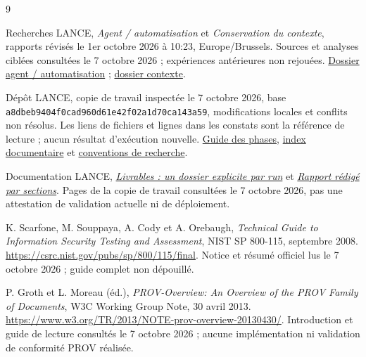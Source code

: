 \documentclass[11pt,a4paper]{article}
\newcommand{\code}[1]{\nolinkurl{#1}}
\begin{document}
\begin{thebibliography}{9}
 Recherches LANCE, \emph{Agent / automatisation} et
\emph{Conservation du contexte}, rapports révisés le 1er octobre 2026 à 10:23,
Europe/Brussels. Sources et analyses ciblées consultées le 7 octobre 2026 ;
expériences antérieures non rejouées.
\href{../2026-09-27-agent-vs-automation/README.md}{Dossier agent / automatisation} ;
\href{../2026-09-29-context-scalability/README.md}{dossier contexte}.

 Dépôt LANCE, copie de travail inspectée le 7 octobre 2026,
base \code{a8dbeb9404f0cad960d61e42f02a1d70ca143a59}, modifications locales et
conflits non résolus. Les liens de fichiers et lignes dans les constats sont
la référence de lecture ; aucun résultat d'exécution nouvelle.
\href{../../src/agent/phases/README.md}{Guide des phases},
\href{../../docs/README.md}{index documentaire} et
\href{../README.md}{conventions de recherche}.

 Documentation LANCE,
\href{../../docs/architecture/run-artifacts.md}{\emph{Livrables : un dossier
explicite par run}} et
\href{../../docs/architecture/report-writing.md}{\emph{Rapport rédigé par
sections}}. Pages de la copie de travail consultées le 7 octobre 2026, pas une
attestation de validation actuelle ni de déploiement.

 K. Scarfone, M. Souppaya, A. Cody et A. Orebaugh,
\emph{Technical Guide to Information Security Testing and Assessment},
NIST SP 800-115, septembre 2008.
\url{https://csrc.nist.gov/pubs/sp/800/115/final}.
Notice et résumé officiel lus le 7 octobre 2026 ; guide complet non dépouillé.

 P. Groth et L. Moreau (éd.), \emph{PROV-Overview: An Overview
of the PROV Family of Documents}, W3C Working Group Note, 30 avril 2013.
\url{https://www.w3.org/TR/2013/NOTE-prov-overview-20130430/}.
Introduction et guide de lecture consultés le 7 octobre 2026 ; aucune
implémentation ni validation de conformité PROV réalisée.
\end{thebibliography}
\end{document}

